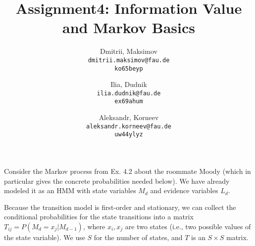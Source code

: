 \documentclass{homework}
\title{Assignment4: Information Value and Markov Basics}
\author{
  Dmitrii, Maksimov\\
  \texttt{dmitrii.maksimov@fau.de} \\
  \texttt{ko65beyp}
  \and
  Ilia, Dudnik\\
  \texttt{ilia.dudnik@fau.de}\\
  \texttt{ex69ahum}
  \and
  Aleksandr, Korneev\\
  \texttt{aleksandr.korneev@fau.de}\\
  \texttt{uw44ylyz}
}
\begin{document}
\maketitle

Consider the Markov process from Ex. 4.2 about the roommate Moody (which
in particular gives the concrete probabilities needed below). We have already modeled it as an HMM with state variables $M_d$ and evidence variables $L_d$.

Because the transition model is first-order and stationary, we can collect the conditional probabilities for the state transitions into a matrix $T_{ij}=P(M_d=x_j|M_{d-1})$, where $x_i, x_j$ are two states (i.e., two possible values of the state variable). We use $S$ for the number of states, and $T$ is an $S\times S$ matrix.
\end{document}
